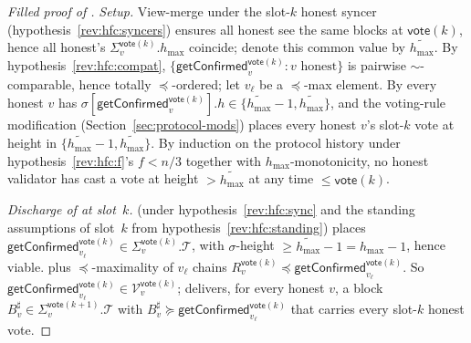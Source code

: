 \ifx\litemode\undefined\documentclass{article}\fi
\newcommand{\T}[0]{\ensuremath{\mathcal{T}}}
\newcommand{\V}[0]{\ensuremath{\mathcal{V}}}
\newcommand{\hmax}{\ensuremath{h_{\max}}\xspace}
\newcommand{\vote}{\ensuremath{\mathsf{vote}}}
\newcommand{\comm}[1]{\ensuremath{\widetilde{#1}}}
\newcommand{\getConfirmed}{\textsf{getConfirmed}\xspace}
\theoremstyle{plain}
\theoremstyle{definition}
\theoremstyle{remark}
\begin{document}
\begin{proof}[Filled proof of ]
\emph{Setup.}
View-merge under the slot-$k$ honest syncer (hypothesis~\ref{rev:hfc:syncers}) ensures all honest see the same blocks at $\vote(k)$, hence all honest's $\Sigma_v^{\vote(k)}.\hmax$ coincide; denote this common value by $\comm{\hmax}$.
By hypothesis~\ref{rev:hfc:compat}, $\{\getConfirmed_v^{\vote(k)} : v \text{ honest}\}$ is pairwise $\sim$-comparable, hence totally $\preceq$-ordered; let $v_\ell$ be a $\preceq$-max element.
By  every honest $v$ has $\sigma[\getConfirmed_v^{\vote(k)}].h \in \{\comm{\hmax}-1, \comm{\hmax}\}$, and the voting-rule modification (Section~\ref{sec:protocol-mods}) places every honest $v$'s slot-$k$ vote at height in $\{\comm{\hmax}-1, \comm{\hmax}\}$.
By induction on the protocol history under hypothesis~\ref{rev:hfc:f}'s $f<n/3$ together with $\hmax$-monotonicity, no honest validator has cast a vote at height $> \comm{\hmax}$ at any time $\leq \vote(k)$.

\emph{Discharge of  at slot~$k$.}
 (under hypothesis~\ref{rev:hfc:sync} and the standing assumptions of slot~$k$ from hypothesis~\ref{rev:hfc:standing}) places $\getConfirmed_{v_\ell}^{\vote(k)} \in \Sigma_v^{\vote(k)}.\T$, with $\sigma$-height $\geq \comm{\hmax}-1 = \hmax-1$, hence viable.
 plus $\preceq$-maximality of $v_\ell$ chains $R_v^{\vote(k)} \preceq \getConfirmed_{v_\ell}^{\vote(k)}$.
So $\getConfirmed_{v_\ell}^{\vote(k)} \in \V_v^{\vote(k)}$;  delivers, for every honest $v$, a block $B^\sharp_v \in \Sigma_v^{\vote(k+1)}.\T$ with $B^\sharp_v \succeq \getConfirmed_{v_\ell}^{\vote(k)}$ that carries every slot-$k$ honest vote.


\end{proof}
\end{document}
